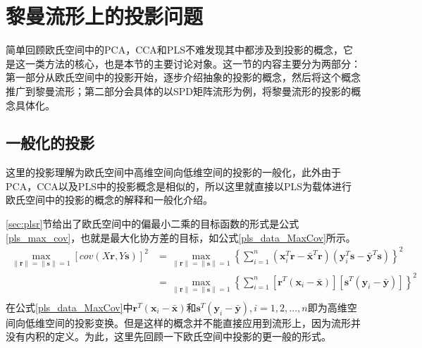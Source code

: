 \section{黎曼流形上的投影问题}
\label{sec:manifold_projection}
简单回顾欧氏空间中的PCA，CCA和PLS不难发现其中都涉及到投影的概念，它是这一类方法的核心，也是本节的主要讨论对象。这一节的内容主要分为两部分：第一部分从欧氏空间中的投影开始，逐步介绍抽象的投影的概念，然后将这个概念推广到黎曼流形；第二部分会具体的以SPD矩阵流形为例，将黎曼流形的投影的概念具体化。
\subsection{一般化的投影}
\label{sec:common_projection}
这里的投影理解为欧氏空间中高维空间向低维空间的投影的一般化，此外由于PCA，CCA以及PLS中的投影概念是相似的，所以这里就直接以PLS为载体进行欧氏空间中的投影的概念的解释和一般化介绍。

\ref{sec:plsr}节给出了欧氏空间中的偏最小二乘的目标函数的形式是公式\ref{pls_max_cov}，也就是最大化协方差的目标，如公式\ref{pls_data_MaxCov}所示。
\begin{equation}
\label{pls_data_MaxCov}
\begin{split}
\max_{\|\bm{r}\|=\|\bm{s}\|=1}[cov(X\bm{r},Y\bm{s})]^{2}&=\max_{\|\bm{r}\|=\|\bm{s}\|=1}\left\{\sum_{i=1}^{n}(\bm{x}_{i}^{T}\bm{r}-\bar{\bm{x}}^{T}\bm{r})(\bm{y}_{i}^{T}\bm{s}-\bar{\bm{y}}^{T}\bm{s})\right\}^2\\
&=\max_{\|\bm{r}\|=\|\bm{s}\|=1}\left\{\sum_{i=1}^{n}[\bm{r}^{T}(\bm{x}_{i}-\bar{\bm{x}})][\bm{s}^{T}(\bm{y}_{i}-\bar{\bm{y}})]\right\}^2\\
\end{split}
\end{equation}
在公式\ref{pls_data_MaxCov}中$\bm{r}^{T}(\bm{x}_{i}-\bar{\bm{x}})$和$\bm{s}^{T}(\bm{y}_{i}-\bar{\bm{y}}),i=1,2,...,n$即为高维空间向低维空间的投影变换。但是这样的概念并不能直接应用到流形上，因为流形并没有内积的定义。为此，这里先回顾一下欧氏空间中投影的更一般的形式。

